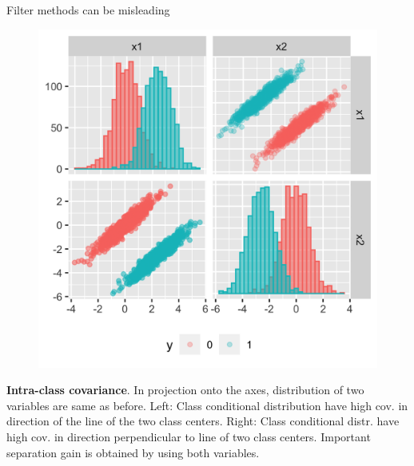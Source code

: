 \documentclass[11pt,compress,t,notes=noshow, xcolor=table]{beamer}
\begin{document}
\begin{vbframe}{Filter methods can be misleading}
\begin{figure}
\begin{minipage}{0.45\textwidth}
        \includegraphics[width=\textwidth]{figure/guyon_example_intra_class_covariance_perpendicular.png} %
    \end{minipage}
    \end{figure}
\vspace{0.3cm}
\footnotesize{\textbf{Intra-class covariance}. In projection onto the axes, distribution of two variables are same as before. Left: Class conditional distribution have high cov. in direction of the line of the two class centers. Right: Class conditional distr. have high cov. in direction perpendicular to line of two class centers. Important separation gain is obtained by using both variables.}

 \framebreak



\end{vbframe}
\end{document}
